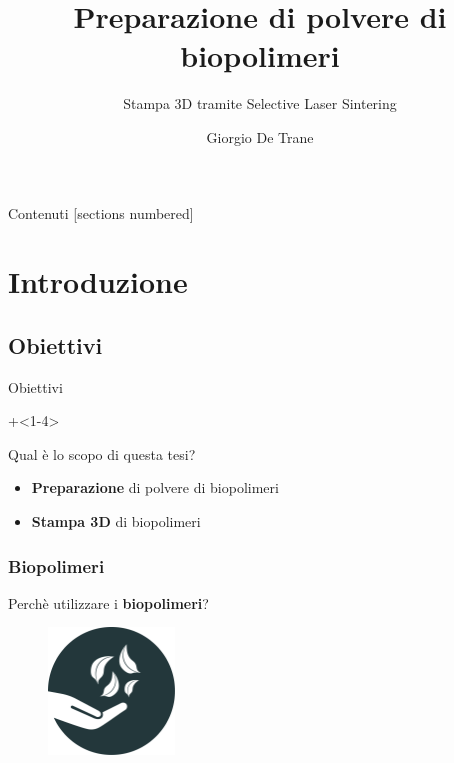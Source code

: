 \documentclass[15pt, aspectratio=169]{beamer}
\title{Preparazione di polvere di biopolimeri}
\subtitle{Stampa 3D tramite Selective Laser Sintering}
\date{}
\author{Giorgio De Trane}
\institute{Politecnico di Torino}
\begin{document}
\maketitle

\begin{frame}{Contenuti}
  [sections numbered]
  \tableofcontents[hideallsubsections]
\end{frame}


\section{Introduzione}
  \subsection{Obiettivi}

  \begin{frame}{Obiettivi}

    \onslide+<1-4>{
      \begin{center}
        \alert<1>{Qual è lo scopo di questa tesi?}
      \end{center}
    
    }

    
    \begin{itemize}
      \item <2->\textbf{Preparazione} di polvere di biopolimeri
      \item <3->\textbf{Stampa 3D} di biopolimeri
    \end{itemize}

  \end{frame}

  \begin{frame}
    \frametitle{Biopolimeri}
    \begin{center}
        Perchè utilizzare i \textbf{biopolimeri}?
    \end{center}
    \begin{figure}[h]
      \centering
      \includegraphics[width=0.3\textwidth]{Pictures/Vector/PDF/hand_bio.pdf}
      
    \end{figure}

  \end{frame}
\end{document}
